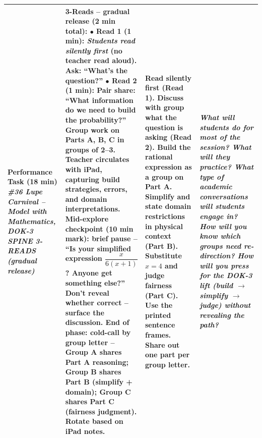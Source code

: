 \documentclass[10pt]{article}
\begin{document}
\begin{xltabular}{\linewidth}{|>{\bfseries\RaggedRight\arraybackslash}p{1.4in}|Y|>{\RaggedRight\arraybackslash}p{1.9in}|>{\itshape\RaggedRight\arraybackslash}p{1.55in}|}
  Performance Task (18 min) \newline
  \emph{\#36 Lupe Carnival -- Model with Mathematics, DOK-3 SPINE} \newline
  \emph{3-READS (gradual release)}
  &
  \textbf{3-Reads -- gradual release (2 min total):} \newline
  $\bullet$ \textbf{Read 1 (1 min):} \emph{Students read silently first} (no teacher read aloud). Ask: ``What's the question?'' \newline
  $\bullet$ \textbf{Read 2 (1 min):} Pair share: ``What information do we need to build the probability?''
  \newline\smallskip
  \textbf{Group work} on Parts A, B, C in groups of 2--3. Teacher circulates with iPad, capturing build strategies, errors, and domain interpretations.
  \newline\smallskip
  \textbf{Mid-explore checkpoint (10 min mark):} brief pause -- ``Is your simplified expression $\dfrac{x}{6(x+1)}$? Anyone get something else?'' Don't reveal whether correct -- surface the discussion.
  \newline\smallskip
  \textbf{End of phase:} cold-call by group letter -- Group A shares Part A reasoning; Group B shares Part B (simplify + domain); Group C shares Part C (fairness judgment). Rotate based on iPad notes.
  &
  Read silently first (Read 1).     \newline
  Discuss with group what the question is asking (Read 2).     \newline
  Build the rational expression as a group on Part A.     \newline
  Simplify and state domain restrictions in physical context (Part B).     \newline
  Substitute $x = 4$ and judge fairness (Part C).     \newline
  Use the printed sentence frames.     \newline
  Share out one part per group letter.
  &
  What will students do for most of the session? What will they practice?     \newline
  What type of academic conversations will students engage in?     \newline
  How will you know which groups need re-direction?     \newline
  How will you press for the DOK-3 lift (build $\rightarrow$ simplify $\rightarrow$ judge) without revealing the path? \\ \hline


\end{xltabular}
\end{document}
